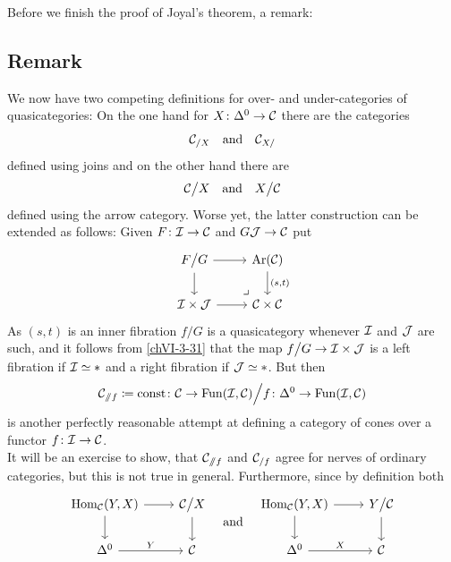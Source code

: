         Before we finish the proof of Joyal's theorem, a remark:

    \subsection{Remark}\label{chVI-3-45}
        We now have two competing definitions for over- and under-categories of quasicategories: On the one hand for $X \colon \Delta^0 \to \mathcal{C}$ there are the categories
        \begin{equation*}
            \mathcal{C}_{/X} \quad \text{and} \quad \mathcal{C}_{X /}
        \end{equation*}
        defined using joins and on the other hand there are
        \begin{equation*}
            \mathcal{C} \big/ X \quad \text{and} \quad X \big/ \mathcal{C}
        \end{equation*}
        defined using the arrow category. Worse yet, the latter construction can be extended as follows: Given $F \colon \mathcal{I} \to \mathcal{C}$ and $G \mathcal{J} \to \mathcal{C}$ put
        \begin{equation*}
            \begin{tikzcd}
                F \big/ G \arrow[d] \arrow[r] \arrow[rd, phantom, "\lrcorner", very near end] & \Ar(\Cc) \arrow[d, "(s{,}t)"] \\
                \Ii \times \Jj \arrow[r] & \Cc \times \Cc
            \end{tikzcd}	
        \end{equation*}
        As $(s, t)$ is an inner fibration $f \big/ G$ is a quasicategory whenever $\mathcal{I}$ and $\mathcal{J}$ are such, and it follows from \ref{chVI-3-31} that the map $f \big/ G \to \mathcal{I} \times \mathcal{J}$ is a left fibration if $\mathcal{I} \simeq *$ and a right fibration if $\mathcal{J} \simeq *$. But then 
        \begin{equation*}
            \mathcal{C}_{\mathbin{/\mkern-6mu/} f} \coloneq \operatorname{const} \colon \mathcal{C} \to \operatorname{Fun}(\mathcal{I}, \mathcal{C}) \Big/ f \colon \Delta^0 \to \operatorname{Fun}(\mathcal{I}, \mathcal{C})
        \end{equation*}
        is another perfectly reasonable attempt at defining a category of cones over a functor $f \colon \mathcal{I} \to \mathcal{C}$.\\
        It will be  an exercise to show, that $\mathcal{C}_{\mathbin{/\mkern-6mu/} f}$ and $\mathcal{C}_{/ f}$ agree for nerves of ordinary categories, but this is not true in general. Furthermore, since by definition both
        \begin{equation*}
            \begin{tikzcd}
                \Hom_{\Cc}(Y, X) \arrow[d] \arrow[r] & \Cc \big/ X \arrow[d] \\
                \Delta^0 \arrow[r, "Y"] & \Cc
            \end{tikzcd}
            \quad
            \text{and}
            \quad
            \begin{tikzcd}
                \Hom_{\Cc}(Y, X) \arrow[d] \arrow[r] & Y \big/ \Cc \arrow[d] \\
                \Delta^0 \arrow[r, "X"] & \Cc
            \end{tikzcd}	
        \end{equation*}
